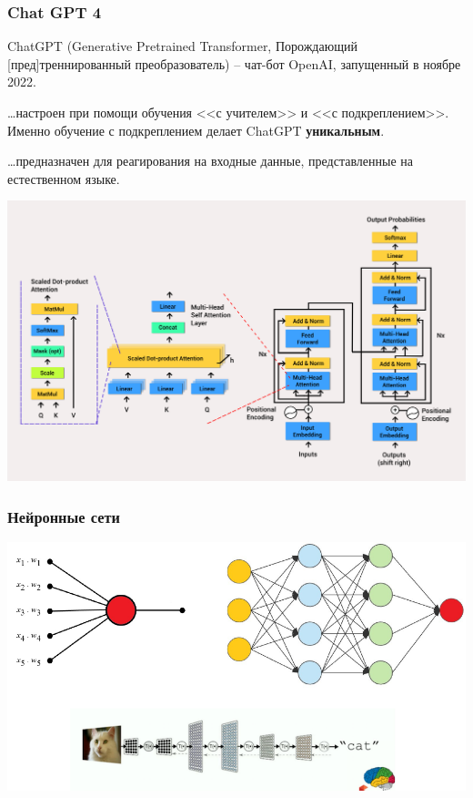 \documentclass[10pt]{beamer}
\begin{document}
\begin{frame}
  \frametitle{Chat GPT 4}
  ChatGPT (Generative Pretrained Transformer, Порождающий [пред]треннированный преобразователь) -- чат-бот OpenAI, запущенный в ноябре 2022.

  \ldots настроен при помощи обучения <<с учителем>> и <<с подкреплением>>.  Именно обучение с подкреплением делает ChatGPT \textbf{уникальным}.

  \ldots предназначен для реагирования на входные данные, представленные на естественном языке.

  \begin{center}
    \includegraphics[width=0.7\linewidth]{pics/transformer-model-architecture.png}
  \end{center}
\end{frame}

\begin{frame}
  \frametitle{Нейронные сети}
  \begin{center}
    \includegraphics[width=1\linewidth]{pics/nn-all.pdf}
  \end{center}
\end{frame}
\end{document}
